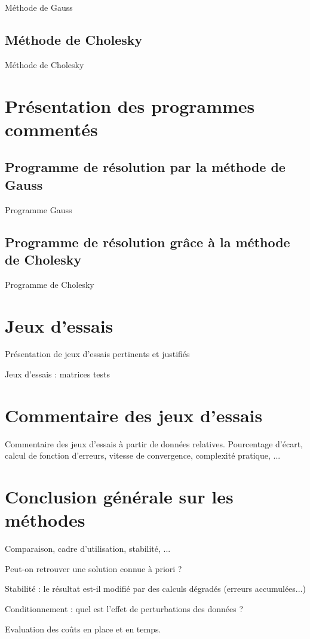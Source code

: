 \documentclass{article}
\begin{document}
Méthode de Gauss

\subsection{Méthode de Cholesky}

Méthode de Cholesky

\section{Présentation des programmes commentés}

\subsection{Programme de résolution par la méthode de Gauss}

\begin{boxedverbatim}
Programme Gauss
\end{boxedverbatim}

\subsection{Programme de résolution grâce à la méthode de Cholesky}

\begin{boxedverbatim}
Programme de Cholesky
\end{boxedverbatim}

\section{Jeux d'essais}

Présentation de jeux d'essais pertinents et justifiés

Jeux d'essais : matrices tests

\section{Commentaire des jeux d'essais}

Commentaire des jeux d'essais à partir de données relatives.
Pourcentage d'écart, calcul de fonction d'erreurs, vitesse de convergence, complexité pratique, ...

\section{Conclusion générale sur les méthodes}

Comparaison, cadre d'utilisation, stabilité, ...

Peut-on retrouver une solution connue à priori ?

Stabilité : le résultat est-il modifié par des calculs dégradés (erreurs accumulées...)

Conditionnement : quel est l'effet de perturbations des données ?

Evaluation des coûts en place et en temps.
\end{document}

